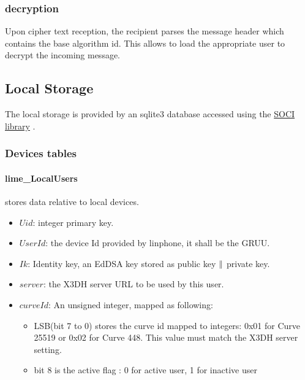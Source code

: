 \documentclass[a4paper,11pt]{article}
\begin{document}
  \subsubsection{decryption}
  Upon cipher text reception, the recipient parses the message header which contains the base algorithm id. This allows to load the appropriate user to decrypt the incoming message.

  \subsection{Local Storage}
    The local storage is provided by an sqlite3 database accessed using the \href{https://github.com/SOCI/soci}{SOCI library} \cite{libsoci}.
    \subsubsection{Devices tables}
    \paragraph*{lime\_LocalUsers} stores data relative to local devices.
    \begin{itemize}
      \item $Uid$: integer primary key.
      \item $UserId$: the device Id provided by linphone, it shall be the GRUU.
      \item $Ik$: Identity key, an EdDSA key stored as public key $\Arrowvert $ private key.
      \item $server$: the X3DH server URL to be used by this user.
      \item $curveId$: An unsigned integer, mapped as following:
        \begin{itemize}
          \item LSB(bit 7 to 0) stores the curve id mapped to integers: 0x01 for Curve 25519 or 0x02 for Curve 448. This value must match the X3DH server setting.
          \item bit 8 is the active flag : 0 for active user, 1 for inactive user
        \end{itemize}
    \end{itemize}
\end{document}
